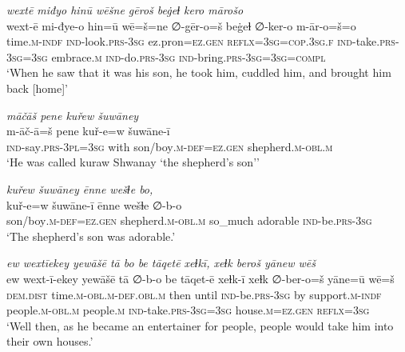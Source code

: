 \ea \label{KŠ.32}
\textit{wextē miđyo hinū wēšne gēroš beġeɫ kero mārošo} \\ 
\gll wext-ē mi-đye-o hin=ū wē=š=ne ∅-gēr-o=š beġeɫ ∅-ker-o m-ār-o=š=o \\ 
 time\textsc{.m}\textsc{-indf} \textsc{ind-}look\textsc{.prs}\textsc{-3sg} ez.pron\textsc{=ez.gen} \textsc{reflx}\textsc{=3sg}\textsc{=cop}\textsc{.3sg}\textsc{.f} \textsc{ind-}take\textsc{.prs}\textsc{-3sg}\textsc{=3sg} embrace\textsc{.m} \textsc{ind-}do\textsc{.prs}\textsc{-3sg} \textsc{ind-}bring\textsc{.prs}\textsc{-3sg}\textsc{=3sg}\textsc{=compl} \\ 
\glt `When he saw that it was his son, he took him, cuddled him, and brought him back [home]'
\z 
 
\ea \label{KŠ.33}
\textit{māčāš pene kuřew šuwāney} \\ 
\gll m-āč-ā=š pene kuř-e=w šuwāne-ī \\ 
 \textsc{ind-}say\textsc{.prs}\textsc{-3pl}\textsc{=3sg} with son/boy\textsc{.m}\textsc{-def}\textsc{=ez.gen} shepherd\textsc{.m}\textsc{-obl}\textsc{.m} \\ 
\glt `He was called kuraw Shwanay ‘the shepherd’s son’'
\z 
 
\ea \label{KŠ.34}
\textit{kuřew šuwāney ēnne wešɫe bo,} \\ 
\gll kuř-e=w šuwāne-ī ēnne wešɫe ∅-b-o \\ 
 son/boy\textsc{.m}\textsc{-def}\textsc{=ez.gen} shepherd\textsc{.m}\textsc{-obl}\textsc{.m} so\_much adorable \textsc{ind-}be\textsc{.prs}\textsc{-3sg} \\ 
\glt `The shepherd’s son was adorable.'
\z 
 
\ea \label{KŠ.38}
\textit{ew wextīekey yewāšē tā bo be tāqetē xeɫkī, xeɫk beroš yānew wēš} \\ 
\gll ew wext-ī-ekey yewāšē tā ∅-b-o be tāqet-ē xeɫk-ī xeɫk ∅-ber-o=š yāne=ū wē=š \\ 
 \textsc{dem.dist} time\textsc{.m}\textsc{-obl}\textsc{.m}\textsc{-def}\textsc{.obl}\textsc{.m} then until \textsc{ind-}be\textsc{.prs}\textsc{-3sg} by support\textsc{.m}\textsc{-indf} people\textsc{.m}\textsc{-obl}\textsc{.m} people\textsc{.m} \textsc{ind-}take\textsc{.prs}\textsc{-3sg}\textsc{=3sg} house\textsc{.m}\textsc{=ez.gen} \textsc{reflx}\textsc{=3sg} \\ 
\glt `Well then, as he became an entertainer for people, people would take him into their own houses.'
\z 
 
